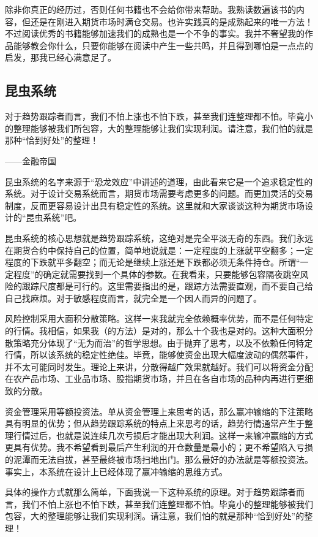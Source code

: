 除非你真正的经历过，否则任何书籍也不会给你带来帮助。我熟读数遍该书的内容，但还是在刚进入期货市场时满仓交易。也许实践真的是成熟起来的唯一方法！不过阅读优秀的书籍能够加速我们的成熟也是一个不争的事实。我并不奢望我的作品能够教会你什么，只要你能够在阅读中产生一些共鸣，并且得到哪怕是一点点的启发，那我已经心满意足了。

\subsection{昆虫系统}

{\kaishu
对于趋势跟踪者而言，我们不怕上涨也不怕下跌，甚至我们连整理都不怕。毕竟小的整理能够被我们所包容，大的整理能够让我们实现利润。请注意，我们怕的就是那种“恰到好处”的整理！

\hfill ——金融帝国
}

昆虫系统的名字来源于“恐龙效应”中讲述的道理，由此看来它是一个追求稳定性的系统。对于设计交易系统而言，期货市场需要考虑更多的问题。而更加灵活的交易制度，反而更容易设计出具有稳定性的系统。这里就和大家谈谈这种为期货市场设计的“昆虫系统”吧。

昆虫系统的核心思想就是趋势跟踪系统，这绝对是完全平淡无奇的东西。我们永远在期货合约中保持自己的位置，简单地说就是：一定程度的上涨就平空翻多；一定程度的下跌就平多翻空；而无论是继续上涨还是下跌都必须无条件持仓。所谓“一定程度”的确定就需要找到一个具体的参数。在我看来，只要能够包容隔夜跳空风险的跟踪尺度都是可行的。这里需要指出的是，跟踪方法需要直观，而不要自己给自己找麻烦。对于敏感程度而言，就完全是一个因人而异的问题了。

风险控制采用大面积分散策略。这样一来我就完全依赖概率优势，而不是任何特定的行情。我相信，如果我（的方法）是对的，那么十个我也是对的。这种大面积分散策略充分体现了“无为而治”的哲学思想。由于抛弃了思考，以及不依赖任何特定行情，所以该系统的稳定性绝佳。毕竟，能够使资金出现大幅度波动的偶然事件，并不太可能同时发生。理论上来讲，分散得越广效果就越好。我们可以将资金分配在农产品市场、工业品市场、股指期货市场，并且在各自市场的品种内再进行更细致的分散。

资金管理采用等额投资法。单从资金管理上来思考的话，那么赢冲输缩的下注策略具有明显的优势；但从趋势跟踪系统的特点上来思考的话，趋势行情通常产生于整理行情过后，也就是说连续几次亏损后才能出现大利润。这样一来输冲赢缩的方式更具有优势。我不希望看到最后产生利润的开仓数量是最小的；更不希望陷入亏损的泥潭而无法自拔，甚至最终被市场扫地出门。那么最好的办法就是等额投资法。事实上，本系统在设计上已经体现了赢冲输缩的思维方式。

具体的操作方式就那么简单，下面我说一下这种系统的原理。对于趋势跟踪者而言，我们不怕上涨也不怕下跌，甚至我们连整理都不怕。毕竟小的整理能够被我们包容，大的整理能够让我们实现利润。请注意，我们怕的就是那种“恰到好处”的整理！

